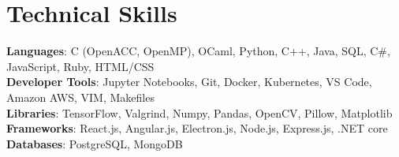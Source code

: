 \documentclass[letterpaper,10pt]{article}
\begin{document}
\section{Technical Skills}
\begin{itemize}[leftmargin=0.15in, label={}]
  \small{\item{
                \textbf{Languages}{: C (OpenACC, OpenMP), OCaml, Python, C++, Java, SQL, C\#, JavaScript, Ruby, HTML/CSS}\\
                \textbf{Developer Tools}{: Jupyter Notebooks, Git, Docker, Kubernetes, VS Code, Amazon AWS, VIM, Makefiles} \\
                \textbf{Libraries}{: TensorFlow, Valgrind, Numpy, Pandas, OpenCV, Pillow, Matplotlib}\\
                \textbf{Frameworks}{: React.js, Angular.js, Electron.js, Node.js, Express.js, .NET core} \\
                \textbf{Databases}{: PostgreSQL, MongoDB}}}
\end{itemize}
\end{document}
